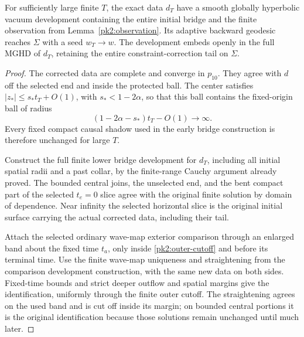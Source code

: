 \begin{proposition}
\label{pk2:attachment-proposition}
For sufficiently large finite $T$, the exact data $d_T$ have a smooth
globally hyperbolic vacuum development containing the entire initial
bridge and the finite observation from
Lemma~\ref{pk2:observation}. Its adaptive backward geodesic reaches
$\Sigma$ with a seed $w_T\to w$. The development embeds openly
in the full MGHD of $d_T$, retaining the entire constraint-correction
tail on $\Sigma$.
\end{proposition}
\begin{proof}
The corrected data are complete and converge in $p_{10}$. They
agree with $d$ off the selected end and inside the protected ball.
The center satisfies $|z_*|\le s_*t_T+O(1)$, with
$s_*<1-2\alpha$, so that this ball contains the fixed-origin ball
of radius
\[
 (1-2\alpha-s_*)t_T-O(1)\longrightarrow\infty.
\]
Every fixed compact causal shadow used in the early bridge
construction is therefore unchanged for large $T$.

Construct the full finite lower bridge development for $d_T$,
including all initial spatial radii and a past collar, by the
finite-range Cauchy argument already proved. The bounded central
joins, the unselected end, and the bent compact part of the
selected $t_e=0$ slice agree with the original finite solution
by domain of dependence. Near infinity the selected horizontal
slice is the original initial surface carrying the actual corrected
data, including their tail.

Attach the selected ordinary wave-map exterior comparison through
an enlarged band about the fixed time $t_a$, only inside
\eqref{pk2:outer-cutoff} and before its terminal time. Use the
finite wave-map uniqueness and straightening from the comparison
development construction, with the same new data on both sides.
Fixed-time bounds and strict deeper outflow and spatial margins
give the identification, uniformly through the finite outer cutoff.
The straightening agrees on the used band and is cut off inside
its margin; on bounded central portions it is the original
identification because those solutions remain unchanged until
much later.


\end{proof}
